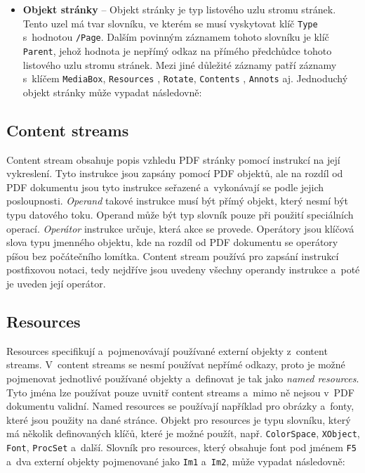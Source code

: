 \begin{itemize}
    \item \textbf{Objekt stránky} -- Objekt stránky je typ listového uzlu stromu
    stránek. Tento uzel má tvar slovníku, ve kterém se musí vyskytovat klíč
    \texttt{Type} s~hodnotou \texttt{/Page}. Dalším povinným záznamem tohoto
    slovníku je klíč \texttt{Parent}, jehož hodnota je nepřímý odkaz na přímého
    předchůdce tohoto listového uzlu stromu stránek. Mezi jiné důležité záznamy
    patří záznamy s~klíčem \texttt{MediaBox}, \texttt{Resources} , \texttt{Rotate},
    \texttt{Contents} , \texttt{Annots} aj.
    Jednoduchý objekt stránky může vypadat následovně:
\end{itemize}


\subsection*{Content streams} \label{content_streams}
Content stream obsahuje popis vzhledu PDF stránky pomocí instrukcí na její
vykreslení. Tyto instrukce jsou zapsány pomocí PDF objektů, ale na rozdíl od
PDF dokumentu jsou tyto instrukce seřazené a~vykonávají se podle jejich
posloupnosti. \emph{Operand} takové instrukce musí být přímý objekt, který 
nesmí být typu datového toku. Operand může být typ slovník pouze při použití
speciálních operací. \emph{Operátor} instrukce určuje, která akce se provede.
Operátory jsou klíčová slova typu jmenného objektu, kde na rozdíl od PDF dokumentu
se operátory píšou bez počátečního lomítka. Content stream používá pro zapsání
instrukcí postfixovou notaci, tedy nejdříve jsou uvedeny všechny operandy instrukce
a~poté je uveden její operátor.


\subsection*{Resources} \label{resources}
Resources specifikují a~pojmenovávají používané externí objekty z~content streams.
V~content streams se nesmí používat nepřímé odkazy, proto je možné pojmenovat
jednotlivé používané objekty a~definovat je tak jako \emph{named resources}.
Tyto jména lze používat pouze uvnitř content streams a~mimo ně nejsou v~PDF
dokumentu validní. Named resources se používají například pro obrázky a~fonty,
které jsou použity na dané stránce. Objekt pro resources je typu slovníku, který
má několik definovaných klíčů, které je možné použít, např. \texttt{ColorSpace}, 
\texttt{XObject}, \texttt{Font}, \texttt{ProcSet} a~další. Slovník pro resources,
který obsahuje font pod jménem \texttt{F5} a~dva externí objekty pojmenované jako
\texttt{Im1} a~\texttt{Im2}, může vypadat následovně:



